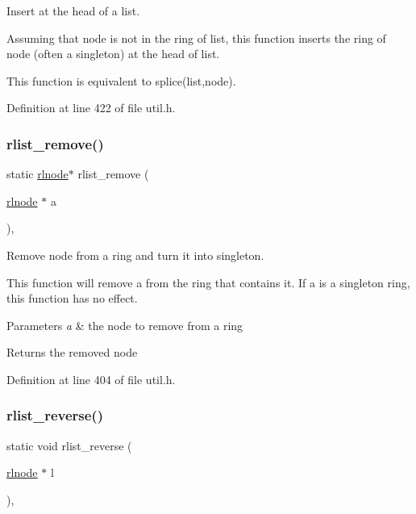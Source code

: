 Insert at the head of a list. 

Assuming that {\ttfamily node} is not in the ring of {\ttfamily list}, this function inserts the ring of {\ttfamily node} (often a singleton) at the head of {\ttfamily list}.

This function is equivalent to {\ttfamily splice(list,node)}. 

Definition at line 422 of file util.\+h.

\mbox{\label{group__rlists_ga9177b286dcefd1d853aae220a98d3c7b}} 
\subsubsection{\texorpdfstring{rlist\+\_\+remove()}{rlist\_remove()}}
{\footnotesize\ttfamily static \hyperlink{group__rlists_ga8f6244877f7ce2322c90525217ea6e7a}{rlnode}$\ast$ rlist\+\_\+remove (\begin{DoxyParamCaption}\item[{\hyperlink{group__rlists_ga8f6244877f7ce2322c90525217ea6e7a}{rlnode} $\ast$}]{a }\end{DoxyParamCaption})\hspace{0.3cm}{\ttfamily [inline]}, {\ttfamily [static]}}



Remove node from a ring and turn it into singleton. 

This function will remove {\ttfamily a} from the ring that contains it. If {\ttfamily a} is a singleton ring, this function has no effect. 
\begin{DoxyParams}{Parameters}
{\em a} & the node to remove from a ring \\
\hline
\end{DoxyParams}
\begin{DoxyReturn}{Returns}
the removed node 
\end{DoxyReturn}


Definition at line 404 of file util.\+h.

\mbox{\label{group__rlists_ga3911836f21f2f50b4caa2fa1d8e1f1de}} 
\subsubsection{\texorpdfstring{rlist\+\_\+reverse()}{rlist\_reverse()}}
{\footnotesize\ttfamily static void rlist\+\_\+reverse (\begin{DoxyParamCaption}\item[{\hyperlink{group__rlists_ga8f6244877f7ce2322c90525217ea6e7a}{rlnode} $\ast$}]{l }\end{DoxyParamCaption})\hspace{0.3cm}{\ttfamily [inline]}, {\ttfamily [static]}}



